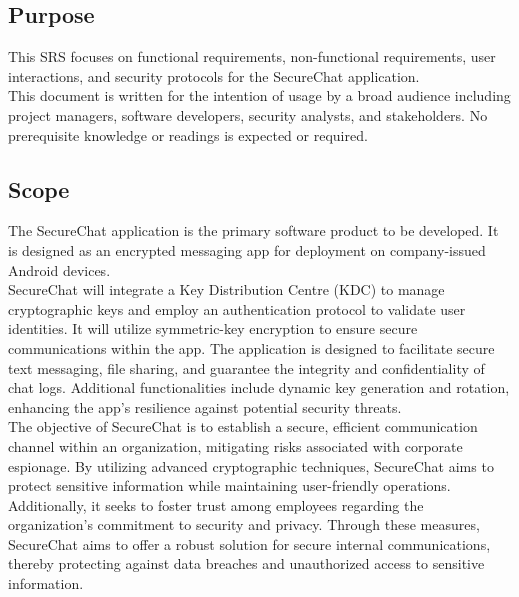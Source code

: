 \documentclass[]{article}
\begin{document}
\subsection{Purpose}
\label{sub:purpose}
This SRS focuses on functional requirements, non-functional requirements, user interactions, and security protocols for the SecureChat application.\\
This document is written for the intention of usage by a broad audience including project managers, software developers, security analysts, and stakeholders. No prerequisite knowledge or readings is expected or required.

\subsection{Scope}
\label{sub:scope}
The SecureChat application is the primary software product to be developed. It is designed as an encrypted messaging app for deployment on company-issued Android devices.\\
SecureChat will integrate a Key Distribution Centre (KDC) to manage cryptographic keys and employ an authentication protocol to validate user identities. It will utilize symmetric-key encryption to ensure secure communications within the app. The application is designed to facilitate secure text messaging, file sharing, and guarantee the integrity and confidentiality of chat logs. Additional functionalities include dynamic key generation and rotation, enhancing the app's resilience against potential security threats.\\
The objective of SecureChat is to establish a secure, efficient communication channel within an organization, mitigating risks associated with corporate espionage. By utilizing advanced cryptographic techniques, SecureChat aims to protect sensitive information while maintaining user-friendly operations. Additionally, it seeks to foster trust among employees regarding the organization's commitment to security and privacy. Through these measures, SecureChat aims to offer a robust solution for secure internal communications, thereby protecting against data breaches and unauthorized access to sensitive information.
\end{document}
